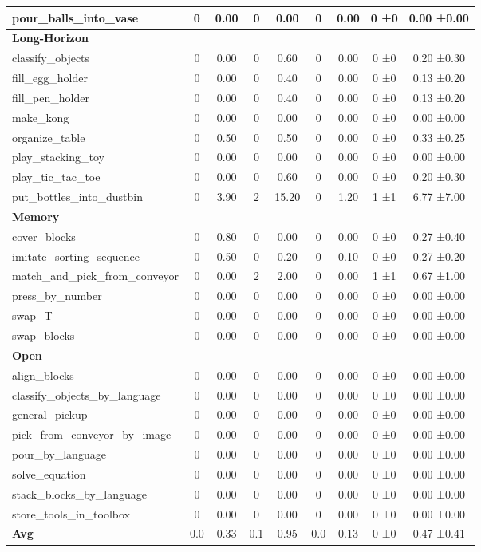 \begin{table}[H]
{\begin{tabular}{l|c|c|c|c|c|c|c|c}
pour\_balls\_into\_vase & 0 & 0.00 & 0 & 0.00 & 0 & 0.00 & 0 ±0 & 0.00 ±0.00 \\
\hline
\multicolumn{9}{l}{\textbf{Long-Horizon}} \\
classify\_objects & 0 & 0.00 & 0 & 0.60 & 0 & 0.00 & 0 ±0 & 0.20 ±0.30 \\
fill\_egg\_holder & 0 & 0.00 & 0 & 0.40 & 0 & 0.00 & 0 ±0 & 0.13 ±0.20 \\
fill\_pen\_holder & 0 & 0.00 & 0 & 0.40 & 0 & 0.00 & 0 ±0 & 0.13 ±0.20 \\
make\_kong & 0 & 0.00 & 0 & 0.00 & 0 & 0.00 & 0 ±0 & 0.00 ±0.00 \\
organize\_table & 0 & 0.50 & 0 & 0.50 & 0 & 0.00 & 0 ±0 & 0.33 ±0.25 \\
play\_stacking\_toy & 0 & 0.00 & 0 & 0.00 & 0 & 0.00 & 0 ±0 & 0.00 ±0.00 \\
play\_tic\_tac\_toe & 0 & 0.00 & 0 & 0.60 & 0 & 0.00 & 0 ±0 & 0.20 ±0.30 \\
put\_bottles\_into\_dustbin & 0 & 3.90 & 2 & 15.20 & 0 & 1.20 & 1 ±1 & 6.77 ±7.00 \\
\hline
\multicolumn{9}{l}{\textbf{Memory}} \\
cover\_blocks & 0 & 0.80 & 0 & 0.00 & 0 & 0.00 & 0 ±0 & 0.27 ±0.40 \\
imitate\_sorting\_sequence & 0 & 0.50 & 0 & 0.20 & 0 & 0.10 & 0 ±0 & 0.27 ±0.20 \\
match\_and\_pick\_from\_conveyor & 0 & 0.00 & 2 & 2.00 & 0 & 0.00 & 1 ±1 & 0.67 ±1.00 \\
press\_by\_number & 0 & 0.00 & 0 & 0.00 & 0 & 0.00 & 0 ±0 & 0.00 ±0.00 \\
swap\_T & 0 & 0.00 & 0 & 0.00 & 0 & 0.00 & 0 ±0 & 0.00 ±0.00 \\
swap\_blocks & 0 & 0.00 & 0 & 0.00 & 0 & 0.00 & 0 ±0 & 0.00 ±0.00 \\
\hline
\multicolumn{9}{l}{\textbf{Open}} \\
align\_blocks & 0 & 0.00 & 0 & 0.00 & 0 & 0.00 & 0 ±0 & 0.00 ±0.00 \\
classify\_objects\_by\_language & 0 & 0.00 & 0 & 0.00 & 0 & 0.00 & 0 ±0 & 0.00 ±0.00 \\
general\_pickup & 0 & 0.00 & 0 & 0.00 & 0 & 0.00 & 0 ±0 & 0.00 ±0.00 \\
pick\_from\_conveyor\_by\_image & 0 & 0.00 & 0 & 0.00 & 0 & 0.00 & 0 ±0 & 0.00 ±0.00 \\
pour\_by\_language & 0 & 0.00 & 0 & 0.00 & 0 & 0.00 & 0 ±0 & 0.00 ±0.00 \\
solve\_equation & 0 & 0.00 & 0 & 0.00 & 0 & 0.00 & 0 ±0 & 0.00 ±0.00 \\
stack\_blocks\_by\_language & 0 & 0.00 & 0 & 0.00 & 0 & 0.00 & 0 ±0 & 0.00 ±0.00 \\
store\_tools\_in\_toolbox & 0 & 0.00 & 0 & 0.00 & 0 & 0.00 & 0 ±0 & 0.00 ±0.00 \\
\hline
\textbf{Avg} & 0.0 & 0.33 & 0.1 & 0.95 & 0.0 & 0.13 & 0 ±0 & 0.47 ±0.41 \\
\hline
\end{tabular}
}
\end{table}
